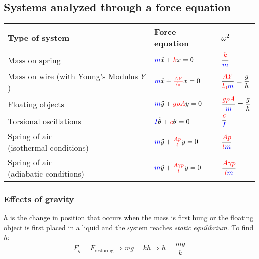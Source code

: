 \documentclass[11pt,letterpaper,titlepage,oneside]{book}
\begin{document}
\subsection{Systems analyzed through a force equation}
\begin{center}
	\renewcommand{\arraystretch}{2.5}
\begin{tabular}{lll}
	\hline
	Type of system & Force equation & $\omega^2$ \\ \hline
	Mass on spring &
		$\textcolor{blue}{m}\ddot{x} + \textcolor{red}{k}x = 0$ &
		$\dfrac{\color{red}{k}}{\color{blue}m}$
		\\
	\parbox{4cm}{Mass on wire \\\footnotesize{(with Young's Modulus $Y$)}} &
		$\textcolor{blue}{m}\ddot{x} + \textcolor{red}{\frac{AY}{l_0}}x = 0$ &
		$\dfrac{\color{red}{AY}}{\color{red}{l_0}\color{blue}m} = \dfrac{g}{h}$ 
		\\
	Floating objects &
		$\textcolor{blue}{m}\ddot{y} + \textcolor{red}{g\rho A}y = 0$ &
		$\dfrac{\color{red}{g\rho A}}{\color{blue}m} = \dfrac{g}{h}$ 
		\\
	Torsional oscillations &
		$\textcolor{blue}{I}\ddot{\theta} + \textcolor{red}{c}\theta = 0$ &
		$\dfrac{\color{red}{c}}{\color{blue}I}$ 
		\\
	\parbox{3.5cm}{Spring of air \\\footnotesize{(isothermal conditions)}} &
		$\textcolor{blue}{m}\ddot{y} + \textcolor{red}{\frac{Ap}{l}}y = 0$ &
		$\dfrac{\color{red}{Ap}}{\color{red}{l}\color{blue}m}$ 
		\\
	\parbox{3.5cm}{Spring of air \\\footnotesize{(adiabatic conditions)}} &
		$\textcolor{blue}{m}\ddot{y} + \textcolor{red}{\frac{A\gamma p}{l}}y = 0$ &
		$\dfrac{\color{red}{A\gamma p}}{\color{red}{l}\color{blue}m}$ 
		\\
	\hline
\end{tabular}
\renewcommand{\arraystretch}{1}
\end{center}


\subsubsection{Effects of gravity}
$h$ is the change in position that occurs when the mass is first hung or the floating object is first placed in a liquid and the system reaches \emph{static equilibrium}. To find $h$:
\[ F_g = F_\text{restoring}\Longrightarrow mg = kh \Longrightarrow h = \frac{mg}{k} \]
\end{document}
